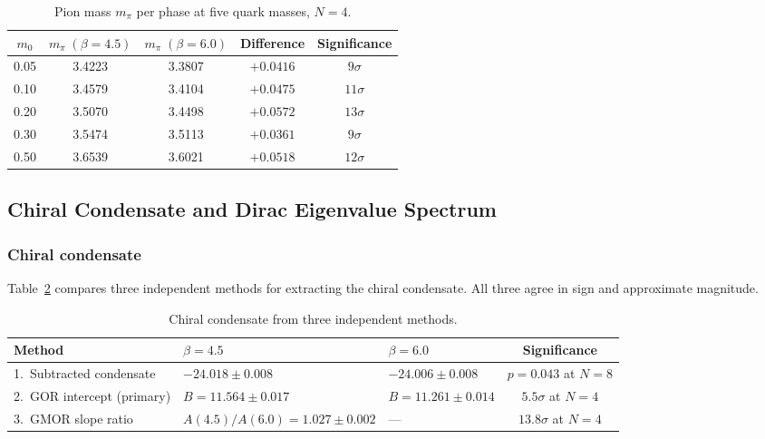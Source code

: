 \documentclass[12pt]{article}
\begin{document}
\begin{table}[ht]
\centering
\caption{Pion mass $m_\pi$ per phase at five quark masses, $N=4$.}
\label{tab:pion}
\begin{tabular}{@{}ccccc@{}}
  \toprule
  $m_0$ & $m_\pi\;(\beta=4.5)$ & $m_\pi\;(\beta=6.0)$
    & Difference & Significance \\
  \midrule
  0.05 & 3.4223 & 3.3807 & $+0.0416$ & $9\sigma$  \\
  0.10 & 3.4579 & 3.4104 & $+0.0475$ & $11\sigma$ \\
  0.20 & 3.5070 & 3.4498 & $+0.0572$ & $13\sigma$ \\
  0.30 & 3.5474 & 3.5113 & $+0.0361$ & $9\sigma$  \\
  0.50 & 3.6539 & 3.6021 & $+0.0518$ & $12\sigma$ \\
  \bottomrule
\end{tabular}
\end{table}

\subsection{Chiral Condensate and Dirac Eigenvalue Spectrum}
\label{sec:chiral}

\subsubsection{Chiral condensate}
\label{sec:condensate}

Table~\ref{tab:condensate} compares three independent methods for
extracting the chiral condensate.  All three agree in sign and
approximate magnitude.

\begin{table}[ht]
\centering
\caption{Chiral condensate from three independent methods.}
\label{tab:condensate}
\begin{tabular}{@{}lllc@{}}
  \toprule
  Method & $\beta=4.5$ & $\beta=6.0$ & Significance \\
  \midrule
  1.\ Subtracted condensate
    & $-24.018\pm0.008$ & $-24.006\pm0.008$ & $p=0.043$ at $N=8$ \\
  2.\ GOR intercept (primary)
    & $B=11.564\pm0.017$ & $B=11.261\pm0.014$ & $5.5\sigma$ at $N=4$ \\
  3.\ GMOR slope ratio
    & $A(4.5)/A(6.0)=1.027\pm0.002$ & --- & $13.8\sigma$ at $N=4$ \\
  \bottomrule
\end{tabular}
\end{table}
\end{document}
